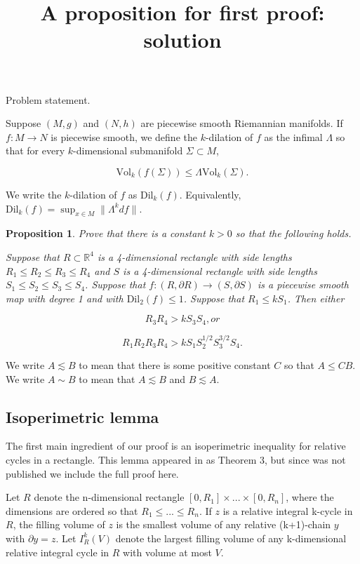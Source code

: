 \documentclass{amsart}
\newtheorem*{theorem 1}{Theorem 1}
\newtheorem*{theorem 2}{Theorem 2}
\newtheorem*{theorem 3}{Theorem 3}
\newtheorem{prop}{Proposition}[section]
\numberwithin{equation}{section}
\newcommand{\Dil}{\textrm{Dil}}
\newcommand{\Vol}{\textrm{Vol}}
\newcommand{\RR}{\mathbb{R}}
\begin{document}
\title{A proposition for first proof: solution}

\maketitle

Problem statement.

Suppose $(M, g)$ and $(N,h)$ are piecewise smooth Riemannian manifolds.   If $f: M \rightarrow N$ is piecewise smooth,  we define the $k$-dilation of $f$ as the infimal $\Lambda$ so that for every $k$-dimensional submanifold $\Sigma \subset M$, 

$$ \Vol_k( f(\Sigma) ) \le \Lambda \Vol_k (\Sigma). $$

\noindent We write the $k$-dilation of $f$ as $\Dil_k(f)$.   Equivalently,  $\Dil_k(f) = \sup_{x \in M} \| \Lambda^k df \|$.

\begin{prop}  Prove that there is a constant $k > 0$ so that the following holds.

Suppose that $R \subset \RR^4$ is a 4-dimensional rectangle with side lengths $R_1 \le R_2 \le R_3 \le R_4$ and $S$ is a 4-dimensional rectangle with side lengths $S_1 \le S_2 \le S_3 \le S_4$.   Suppose that $f: (R, \partial R) \rightarrow (S, \partial S)$ is a piecewise smooth map with degree 1 and with $\Dil_2(f) \le 1$.   Suppose that $R_1 \le k S_1$.   Then either

$$ R_3 R_4 > k S_3 S_4,  or $$

$$ R_1 R_2 R_3 R_4 > k S_1 S_2^{1/2} S_3^{3/2} S_4. $$

\end{prop}




We write $A \lesssim B$ to mean that there is some positive constant $C$ so that $ A \le C B$.  We write $A \sim B$ to mean that $A \lesssim B$ and $B \lesssim A$.  

\subsection{Isoperimetric lemma}

The first main ingredient of our proof is an isoperimetric inequality for relative cycles in a rectangle.   This lemma appeared in \cite{G} as Theorem 3,  but since \cite{G} was not published we include the full proof here.

Let $R$ denote the n-dimensional rectangle $[0, R_1] \times ...
\times [0, R_n]$, where the dimensions are ordered so that $R_1
\le ... \le R_n$.    If $z$ is a relative integral k-cycle in $R$, the filling volume
of $z$ is the smallest volume of any relative (k+1)-chain $y$
with $\partial y = z$.  Let $I^k_R(V)$ denote the largest filling
volume of any k-dimensional relative integral cycle in $R$ with
volume at most $V$.
\end{document}
